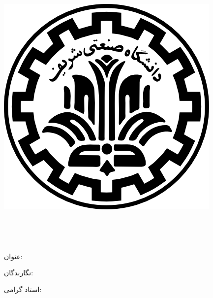 
\pagestyle{empty}

\begin{center}

\includegraphics[scale=0.2]{front/template/images/logo.png}

\begin{large}

\vspace{-0.2cm}
\ThesisUniversity \\[-0.3em]
\ThesisDepartment

\vspace{0.5cm}

\ThesisType \\[-0.3em]
\ThesisMajor

\end{large}

\vspace{1cm}

{عنوان:}\\[1.2em]
{\LARGE\textbf{\ThesisTitle}}

\vspace{1cm}

{نگارندگان:}\\[.5em]
{\large\textbf{\ThesisAuthor}}

\vspace{0.7cm}

{استاد گرامی:}\\[.5em]
{\large\textbf{\ThesisSupervisor}}

\vspace{1.3cm}

\ThesisDate

\end{center}

\newpage
